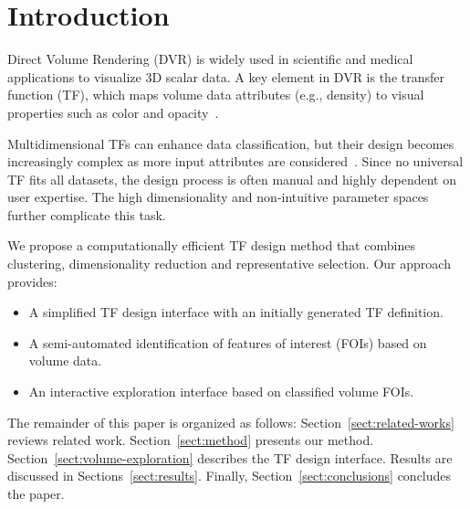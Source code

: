 \section{Introduction}
\label{sect:introduction}

Direct Volume Rendering (DVR) is widely used in scientific and medical applications to visualize 3D scalar data. A key element in DVR is the transfer function (TF), which maps volume data attributes (e.g., density) to visual properties such as color and opacity~\cite{ljung2016}.

Multidimensional TFs can enhance data classification, but their design becomes increasingly complex as more input attributes are considered~\cite{ljung2016, pan2024}. Since no universal TF fits all datasets, the design process is often manual and highly dependent on user expertise. The high dimensionality and non-intuitive parameter spaces further complicate this task.

We propose a computationally efficient TF design method that combines clustering, dimensionality reduction and representative selection. Our approach provides:

\begin{itemize}
    \item A simplified TF design interface with an initially generated TF definition.
    \item A semi-automated identification of features of interest (FOIs) based on volume data.
    \item An interactive exploration interface based on classified volume FOIs.
\end{itemize}

The remainder of this paper is organized as follows: Section~\ref{sect:related-works} reviews related work. Section~\ref{sect:method} presents our method. Section~\ref{sect:volume-exploration} describes the TF design interface. Results are discussed in Sections~\ref{sect:results}. Finally, Section~\ref{sect:conclusions} concludes the paper.
